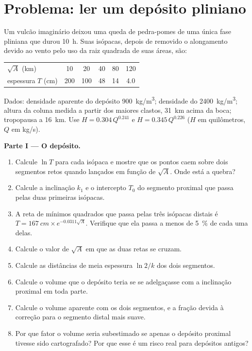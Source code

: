 \section{Problema: ler um depósito pliniano}

\begin{problem}
\label{pb:b2:eruptive-styles:1}
Um vulcão imaginário deixou uma queda de pedra-pomes de uma única fase pliniana que
durou \qty{10}{\hour}. Suas isópacas, depois de removido o alongamento devido ao vento pelo
uso da raiz quadrada de suas áreas, são:
\begin{center}
\small
\begin{tabular}{lccccc}
\hline
$\sqrt A$ (\unit{km}) & 10 & 20 & 40 & 80 & 120 \\
espessura $T$ (\unit{cm}) & 200 & 100 & 48 & 14 & 4.0 \\
\hline
\end{tabular}
\end{center}
Dados: densidade aparente do depósito \qty{900}{kg/m^3}; densidade do 
\qty{2400}{kg/m^3}; altura da coluna medida a partir dos maiores clastos,
\qty{31}{km} acima da boca; tropopausa a \qty{16}{km}. Use $H =
0.304\,Q^{0.241}$ e $H = 0.345\,Q^{0.226}$ ($H$ em quilômetros, $Q$ em
\unit{kg/s}).

\medskip\noindent\textbf{Parte I --- O depósito.}
\begin{enumerate}
\item Calcule $\ln T$ para cada isópaca e mostre que os pontos caem sobre dois
segmentos retos quando lançados em função de $\sqrt A$. Onde está a quebra?
\item Calcule a inclinação $k_1$ e o intercepto $T_0$ do segmento proximal
que passa pelas duas primeiras isópacas.
\item A reta de mínimos quadrados que passa pelas três isópacas distais é $T =
\qty{167}{cm}\times e^{-0.0311\sqrt A}$. Verifique que ela passa a menos de
\qty{5}{\percent} de cada uma delas.
\item Calcule o valor de $\sqrt A$ em que as duas retas se cruzam.
\item Calcule as distâncias de meia espessura $\ln 2/k$ dos dois segmentos.
\item Calcule o volume que o depósito teria se se adelgaçasse com a inclinação proximal
em toda parte.
\item Calcule o volume aparente com os dois segmentos, e a fração devida à
correção para o segmento distal mais suave.
\item Por que fator o volume seria subestimado se apenas o depósito proximal
tivesse sido cartografado? Por que esse é um risco real para depósitos antigos?
\end{enumerate}


\end{problem}
